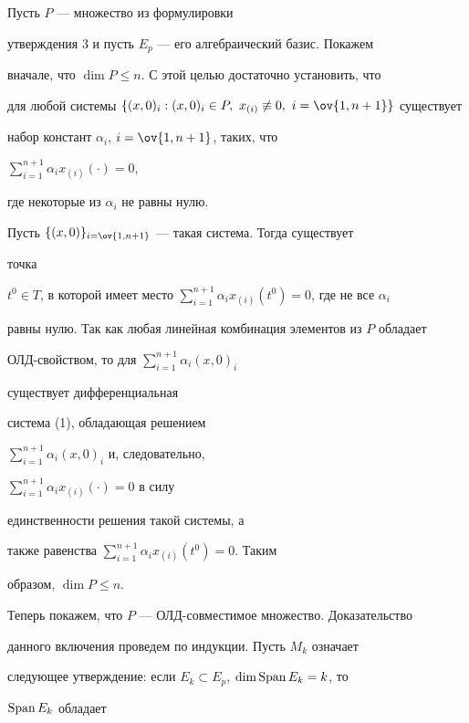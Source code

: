  


\begin{pf} 


Пусть $P$ --- множество из формулировки 


утверждения 3 и пусть $E_p$ --- его алгебраический базис. Покажем 


вначале, что $\dim P\le n$. С этой целью достаточно установить, что 


для любой системы $\{(x,0)_i:(x,0)_i\in P,\ x_{(i)}\not\equiv0,\ 


i=\ov{1,n+1}\}$ существует 


набор констант $\alpha_i$, $i=\ov{1,n+1}$, таких, что 


$\sum\limits^{n+1}_{i=1}\alpha_i x_{(i)}(\cdot)=0$, 


где некоторые из $\alpha_i$ не равны нулю. 


 


Пусть $\{(x,0)\}_{i=\ov{1,n+1}}$ --- такая система. Тогда существует 


точка 


$t^0\in T$, в которой имеет место $\sum\limits^{n+1}_{i=1}\alpha_i 


x_{(i)}(t^0)=0$, где не все $\alpha_i$ 


равны нулю. Так как любая линейная комбинация элементов из $P$ обладает 


ОЛД-свойством, то для $\sum\limits^{n+1}_{i=1}\alpha_i(x,0)_i$ 


существует дифференциальная 


система (1), обладающая решением 


$\sum\limits^{n+1}_{i=1}\alpha_i(x,0)_i$ и, следовательно, 


$\sum\limits^{n+1}_{i=1}\alpha_i x_{(i)}(\cdot)=0$ в силу 


единственности решения такой системы, а 


также равенства $\sum\limits^{n+1}_{i=1}\alpha_i x_{(i)}(t^0)=0$. Таким 


образом, $\dim P\le n$. 


 


Теперь покажем, что $P$ --- ОЛД-совместимое множество. Доказательство 


данного включения проведем по индукции. Пусть $M_k$ означает 


следующее утверждение: если $E_k\subset E_p$, $\dim\operatorname{Span} E_k=k$, то 


$\operatorname{Span} E_k$ обладает 



\end{pf}
